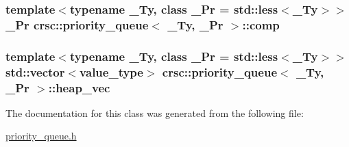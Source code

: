 \subsubsection[{\texorpdfstring{comp}{comp}}]{\setlength{\rightskip}{0pt plus 5cm}template$<$typename \+\_\+\+Ty, class \+\_\+\+Pr = std\+::less$<$\+\_\+\+Ty$>$$>$ \+\_\+\+Pr {\bf crsc\+::priority\+\_\+queue}$<$ \+\_\+\+Ty, \+\_\+\+Pr $>$\+::comp\hspace{0.3cm}{\ttfamily [private]}}\hypertarget{classcrsc_1_1priority__queue_aeb39fce3f1ec0299540cf5431ca4129e}{}\label{classcrsc_1_1priority__queue_aeb39fce3f1ec0299540cf5431ca4129e}
\subsubsection[{\texorpdfstring{heap\+\_\+vec}{heap_vec}}]{\setlength{\rightskip}{0pt plus 5cm}template$<$typename \+\_\+\+Ty, class \+\_\+\+Pr = std\+::less$<$\+\_\+\+Ty$>$$>$ std\+::vector$<${\bf value\+\_\+type}$>$ {\bf crsc\+::priority\+\_\+queue}$<$ \+\_\+\+Ty, \+\_\+\+Pr $>$\+::heap\+\_\+vec\hspace{0.3cm}{\ttfamily [private]}}\hypertarget{classcrsc_1_1priority__queue_ab21e7fd1647424d3580e86dc0aec2597}{}\label{classcrsc_1_1priority__queue_ab21e7fd1647424d3580e86dc0aec2597}


The documentation for this class was generated from the following file\+:\begin{DoxyCompactItemize}
\item 
\hyperlink{priority__queue_8h}{priority\+\_\+queue.\+h}\end{DoxyCompactItemize}
